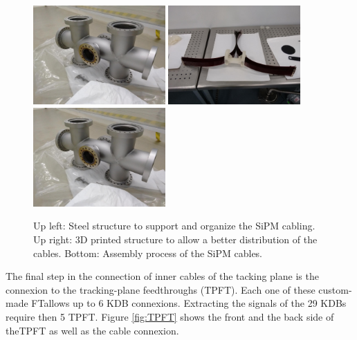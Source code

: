 \begin{figure}[h!]
\begin{center}
\includegraphics[width=0.45\textwidth]{IMG/spaceship_unmounted}
\includegraphics[width=0.45\textwidth]{IMG/spacechip_cabling}
\includegraphics[width=0.45\textwidth]{IMG/spaceship_unmounted}
\caption{Up left: Steel structure to support and organize the SiPM cabling. Up right: 3D printed structure to allow a better distribution of the cables. Bottom: Assembly process of the SiPM cables.}
\label{fig:cabling_spaceship}
\end{center}
\end{figure}

The final step in the connection of inner cables of the tacking plane is the connexion to the tracking-plane feedthroughs (TPFT). Each one of these custom-made FTallows up to 6 KDB connexions. Extracting the signals of the 29 KDBs require then  5 TPFT. Figure \ref{fig:TPFT} shows the front and the back side of theTPFT as well as the cable connexion.

